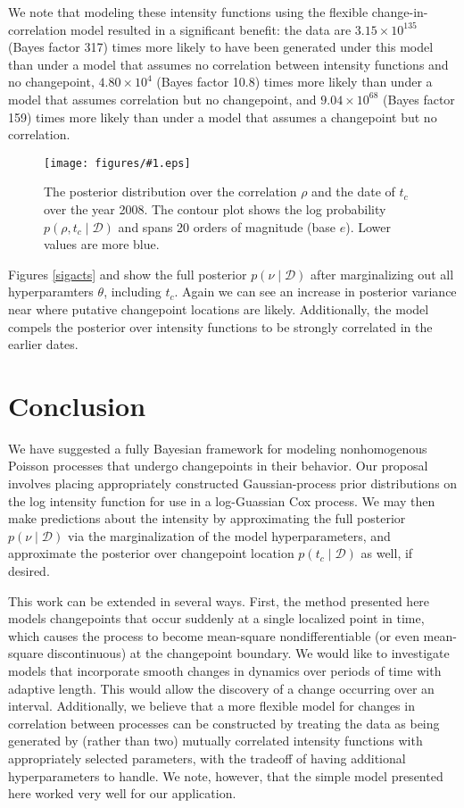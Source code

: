 \documentclass{article}
\newcommand{\psff}[1]{\texttt{[image: figures/\#1.eps]}}
\newcommand{\cm}[1]{\mathcal{#1}}
\newcommand{\data}{\cm{D}}
\newcommand{\given}{\mid}
\begin{document}
We note that modeling these intensity functions using the flexible
change-in-correlation model resulted in a significant benefit: the
data are $3.15 \times 10^{135}$ (Bayes factor 317) times more likely
to have been generated under this model than under a model that
assumes no correlation between intensity functions and no changepoint,
$4.80 \times 10^{4}$ (Bayes factor 10.8) times more likely than under
a model that assumes correlation but no changepoint, and $9.04 \times
10^{68}$ (Bayes factor 159) times more likely than under a model that
assumes a changepoint but no correlation.

\begin{figure}
  \centering \psff{sigacts_posterior}
  \caption{The posterior distribution over the correlation $\rho$ and
    the date of $t_c$ over the year 2008.  The contour plot shows the
    log probability $p(\rho, t_c \given \data)$ and spans 20 orders of
    magnitude (base $e$).  Lower values are more blue.}
  \label{sigactsjoint}
\end{figure}

Figures \ref{sigacts} and  show the
full posterior $p(\nu \given \data)$ after marginalizing out all
hyperparamters $\theta$, including $t_c$.  Again we can see an
increase in posterior variance near where putative changepoint
locations are likely.  Additionally, the model compels the posterior
over intensity functions to be strongly correlated in the earlier
dates.

\section{Conclusion}

We have suggested a fully Bayesian framework for modeling
nonhomogenous Poisson processes that undergo changepoints in their
behavior.  Our proposal involves placing appropriately constructed
Gaussian-process prior distributions on the log intensity function for
use in a log-Guassian Cox process.  We may then make predictions about
the intensity by approximating the full posterior $p(\nu \given
\data)$ via the marginalization of the model hyperparameters, and
approximate the posterior over changepoint location $p(t_c \given
\data)$ as well, if desired.

This work can be extended in several ways.  First, the method
presented here models changepoints that occur suddenly at a single
localized point in time, which causes the process to become
mean-square nondifferentiable (or even mean-square discontinuous) at
the changepoint boundary.  We would like to investigate models that
incorporate smooth changes in dynamics over periods of time with
adaptive length.  This would allow the discovery of a change occurring
over an interval.  Additionally, we believe that a more flexible model
for changes in correlation between processes can be constructed by
treating the data as being generated by (rather than two) mutually
correlated intensity functions with appropriately selected parameters,
with the tradeoff of having additional hyperparameters to handle.  We
note, however, that the simple model presented here worked very well
for our application.


\end{document}
